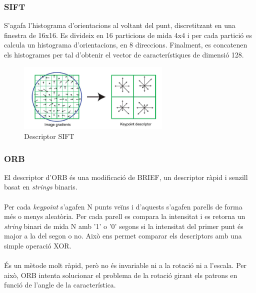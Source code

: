 	\subsubsection{SIFT}
	S'agafa l'histograma d'orientacions al voltant del punt, discretitzant en una finestra de 16x16.
	Es divideix en 16 particions de mida 4x4 i per cada partició es calcula un histograma d'orientacions, en 8 direccions.
	Finalment, es concatenen els histogrames per tal d'obtenir el vector de característiques de dimensió 128.
	\begin{figure}[H]
		\centering
		\includegraphics[width=0.65\textwidth]{images/sift-des}
		\caption{Descriptor SIFT}
	\end{figure}

	\subsubsection{ORB}
	El descriptor d'ORB és una modificació de BRIEF\cite{Calonder:2010:BBR:1888089.1888148}, un descriptor ràpid i senzill basat en \textit{strings} binaris.\\\\
	Per cada \textit{keypoint} s'agafen N punts veïns i d'aquests s'agafen parells de forma més o menys aleatòria. Per cada parell es compara la intensitat i es retorna un \textit{string} binari de mida N amb '1' o '0' segons
	si la intensitat del primer punt és major a la del segon o no. Això ens permet comparar els descriptors amb una simple operació XOR.\\\\
	És un mètode molt ràpid, però no és invariable ni a la rotació ni a l'escala. Per això, ORB intenta solucionar el problema de la rotació girant els patrons en funció de l'angle de la característica.

